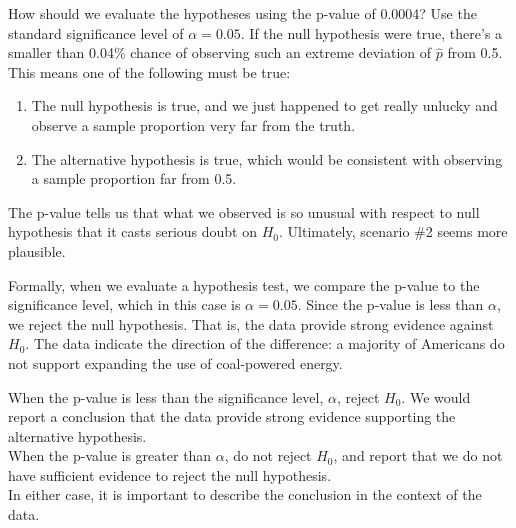 \begin{example}{How should we evaluate the hypotheses using the
    p-value of 0.0004? Use the standard significance level of
    $\alpha = 0.05$.}
  If the null hypothesis were true, there's a smaller than 0.04\%
  chance of observing such an extreme deviation of
  $\hat{p}$ from 0.5.
  This means one of the following must be true:
  \begin{enumerate}
    \item The null hypothesis is true, and we just happened
        to get really unlucky and observe a sample proportion
        very far from the truth.
    \item The alternative hypothesis is true,
        which would be consistent
        with observing a sample proportion far from 0.5.
  \end{enumerate}
  The p-value tells us that what we observed is so unusual
  with respect to null hypothesis that it casts serious doubt
  on $H_0$.
  Ultimately, scenario \#2 seems more plausible.

  Formally, when we evaluate a hypothesis test,
  we compare the p-value to the significance level,
  which in this case is $\alpha = 0.05$.
  Since the p-value is less than $\alpha$,
  we reject the null hypothesis.
  That is, the data provide strong evidence against $H_0$.
  The data indicate the direction of the difference:
  a majority of Americans do not support
  expanding the use of coal-powered energy.
\end{example}


\begin{tipBox}{
  When the p-value is less than the significance level, $\alpha$,
  reject $H_0$. We would report a conclusion that the data provide
  strong evidence supporting the alternative hypothesis. \\[2mm]
  When the p-value is greater than $\alpha$, do not reject $H_0$,
  and report that we do not have sufficient evidence to reject the
  null hypothesis. \\[2mm]
  In either case, it is important to describe the conclusion
  in the context of the data.}
\end{tipBox}








